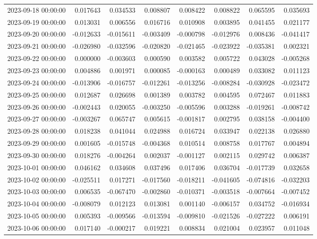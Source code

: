 \begin{tabular}{lrrrrrrr}
2023-09-18 00:00:00 & 0.017643 & 0.034533 & 0.008807 & 0.008422 & 0.008822 & 0.065595 & 0.035693 \\
2023-09-19 00:00:00 & 0.013031 & 0.006556 & 0.016716 & 0.010908 & 0.003895 & 0.041455 & 0.021177 \\
2023-09-20 00:00:00 & -0.012633 & -0.015611 & -0.003409 & -0.000798 & -0.012976 & 0.008436 & -0.041417 \\
2023-09-21 00:00:00 & -0.026980 & -0.032596 & -0.020820 & -0.021465 & -0.023922 & -0.035381 & 0.002321 \\
2023-09-22 00:00:00 & 0.000000 & -0.003603 & 0.000590 & 0.003582 & 0.005722 & 0.043028 & -0.005268 \\
2023-09-23 00:00:00 & 0.004886 & 0.001971 & 0.000085 & -0.000163 & 0.000489 & 0.033082 & 0.011123 \\
2023-09-24 00:00:00 & -0.013906 & -0.016757 & -0.012261 & -0.013256 & -0.008284 & -0.030928 & -0.023472 \\
2023-09-25 00:00:00 & 0.012687 & 0.026698 & 0.001389 & 0.003782 & 0.004595 & 0.072467 & 0.011883 \\
2023-09-26 00:00:00 & -0.002443 & 0.020055 & -0.003250 & -0.005596 & 0.003288 & -0.019261 & -0.008742 \\
2023-09-27 00:00:00 & -0.003267 & 0.065747 & 0.005615 & -0.001817 & 0.002795 & 0.038158 & -0.004400 \\
2023-09-28 00:00:00 & 0.018238 & 0.041044 & 0.024988 & 0.016724 & 0.033947 & 0.022138 & 0.026880 \\
2023-09-29 00:00:00 & 0.001605 & -0.015748 & -0.004368 & 0.010514 & 0.008758 & 0.017767 & 0.004894 \\
2023-09-30 00:00:00 & 0.018276 & -0.004264 & 0.002037 & -0.001127 & 0.002115 & 0.029742 & 0.006387 \\
2023-10-01 00:00:00 & 0.046162 & 0.034608 & 0.037496 & 0.017406 & 0.036704 & -0.017739 & 0.032658 \\
2023-10-02 00:00:00 & -0.025511 & 0.017271 & -0.017560 & -0.018211 & -0.041605 & -0.074816 & -0.032203 \\
2023-10-03 00:00:00 & 0.006535 & -0.067470 & -0.002860 & -0.010371 & -0.003518 & -0.007664 & -0.007452 \\
2023-10-04 00:00:00 & -0.008079 & 0.012123 & 0.013081 & 0.001140 & -0.006157 & 0.034752 & -0.016934 \\
2023-10-05 00:00:00 & 0.005393 & -0.009566 & -0.013594 & -0.009810 & -0.021526 & -0.027222 & 0.006191 \\
2023-10-06 00:00:00 & 0.017140 & -0.000217 & 0.019221 & 0.008834 & 0.021004 & 0.023957 & 0.011048 \\

\end{tabular}
